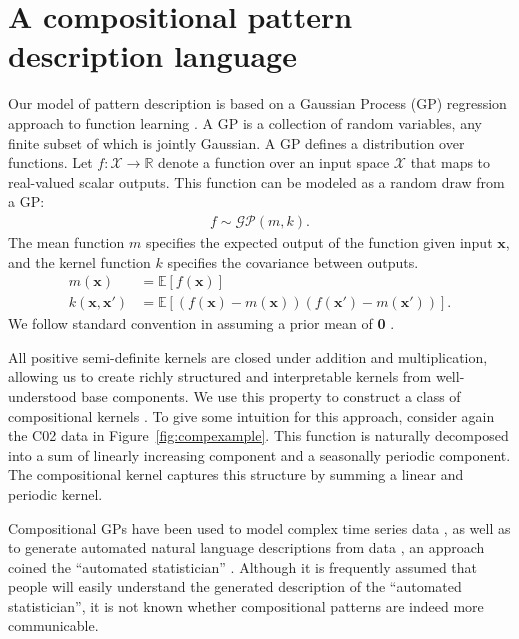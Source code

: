 \documentclass[a4paper,man, floatsintext, natbib]{apa6}
\begin{document}
\section{A compositional pattern description language}

Our model of pattern description is based on a Gaussian Process (GP) regression approach to function learning \citep{rasmussen2006gaussian,Schulz095190}. A GP is a collection of random variables, any finite subset of which is jointly Gaussian. A GP defines a distribution over functions. Let $f: \mathcal{X} \rightarrow \mathbb{R}$ denote a function over an input space $\mathcal{X}$ that maps to real-valued scalar outputs. This function can be modeled as a random draw from a GP:
\begin{align}
f \sim \mathcal{GP}(m,k).
\end{align}
The mean function $m$ specifies the expected output of the function given input $\mathbf{x}$, and the kernel function $k$ specifies the covariance between outputs.
\begin{align}
m(\mathbf{x})&=\mathbb{E}[f( \mathbf{x})]\\
k(\mathbf{x}, \mathbf{x}')&=\mathbb{E}\left[(f( \mathbf{x})-m(\mathbf{x}))(f( \mathbf{x'})-m(\mathbf{x'}))\right].
\end{align}
We follow standard convention in assuming a prior mean of \textbf{0} \citep{rasmussen2006gaussian}.

All positive semi-definite kernels are closed under addition and multiplication, allowing us to create richly structured and interpretable kernels from well-understood base components. We use this property to construct a class of compositional kernels \citep{schulz2017compositional,lloyd2014automatic,duvenaud2013structure}. To give some intuition for this approach, consider again the C02 data in Figure~\ref{fig:compexample}. This function is naturally decomposed into a sum of linearly increasing component and a seasonally periodic component. The compositional kernel captures this structure by summing a linear and periodic kernel.

Compositional GPs have been used to model complex time series data \citep{duvenaud2013structure}, as well as to generate automated natural language descriptions from data \citep{lloyd2014automatic}, an approach coined the ``automated statistician'' \citep{ghahramani2015probabilistic}. Although it is frequently assumed that people will easily understand the generated description of the ``automated statistician'', it is not known whether compositional patterns are indeed more communicable.
\end{document}
